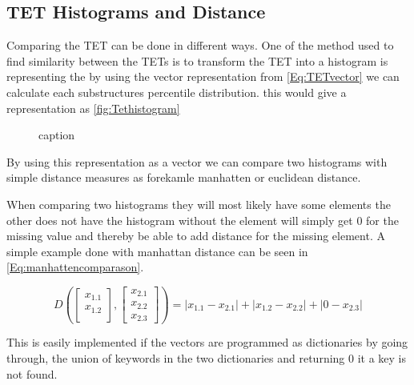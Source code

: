 \subsection{TET Histograms and Distance}
	Comparing the TET can be done in different ways. One of the method used to find similarity between the TETs is to transform the TET into a histogram is representing the by using the vector representation from \autoref{Eq:TETvector} we can calculate each substructures percentile distribution. this would give a representation as \autoref{fig:Tethistogram}
	
	\begin{figure}[H]
		\centering
		\begin{adjustbox}{width=0.5\textwidth}
			
		\end{adjustbox}
		\caption{caption}
		\label{fig:Tethistogram}
	\end{figure}
	
	By using this representation as a vector we can compare two histograms with simple distance measures as forekamle manhatten or euclidean distance.
	
	When comparing two histograms they will most likely have some elements the other does not have the histogram without the element will simply get 0 for the missing value and thereby be able to add distance for the missing element. A simple example done with manhattan distance can be seen in \autoref{Eq:manhattencomparason}.
	
	\begin{equation}\label{Eq:manhattencomparason}
	D(\begin{bmatrix}
	x_{1.1} \\
	x_{1.2} \\
	\end{bmatrix},
	\begin{bmatrix}
	x_{2.1} \\
	x_{2.2} \\
	x_{2.3}
	\end{bmatrix})= |x_{1.1} - x_{2.1}| + |x_{1.2} - x_{2.2}| + |0 - x_{2.3}|
	\end{equation}
	
	This is easily implemented if the vectors are programmed as dictionaries by going through, the union of keywords in the two dictionaries and returning 0 it a key is not found.
